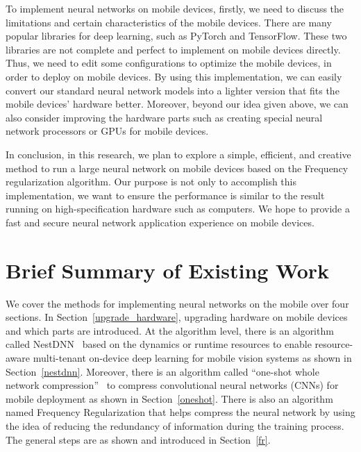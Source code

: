 \documentclass{article}
\begin{document}
To implement neural networks on mobile devices, firstly, we need to discuss the limitations and certain characteristics of the mobile devices. There are many popular libraries for deep learning, such as PyTorch and TensorFlow. These two libraries are not complete and perfect to implement on mobile devices directly. Thus, we need to edit some configurations to optimize the mobile devices, in order to deploy on mobile devices. By using this implementation, we can easily convert our standard neural network models into a lighter version that fits the mobile devices' hardware better. Moreover, beyond our idea given above, we can also consider improving the hardware parts such as creating special neural network processors or GPUs for mobile devices.

In conclusion, in this research, we plan to explore a simple, efficient, and creative method to run a large neural network on mobile devices based on the Frequency regularization algorithm. Our purpose is not only to accomplish this implementation, we want to ensure the performance is similar to the result running on high-specification hardware such as computers. We hope to provide a fast and secure neural network application experience on mobile devices.


\section*{Brief Summary of Existing Work}

We cover the methods for implementing neural networks on the mobile over four sections. In Section~\ref{upgrade_hardware}, upgrading hardware on mobile devices and which parts are introduced. At the algorithm level, there is an algorithm called NestDNN~\cite{fang2018nestdnn} based on the dynamics or runtime resources to enable resource-aware multi-tenant on-device deep learning for mobile vision systems as shown in Section~\ref{nestdnn}. Moreover, there is an algorithm called “one-shot whole network compression”~\cite{kim2016compression} to compress convolutional neural networks (CNNs) for mobile deployment as shown in Section~\ref{oneshot}. There is also an algorithm named Frequency Regularization that helps compress the neural network by using the idea of reducing the redundancy of information during the training process. The general steps are as shown and introduced in Section~\ref{fr}.
\end{document}
